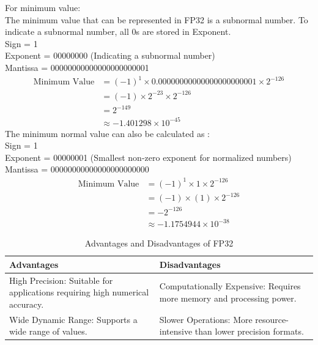 \begin{enumerate}[label=\textbf{\roman*.}]
    For minimum value:\\
    The minimum value that can be represented in FP32 is a subnormal number. To indicate a subnormal number, all 0s are stored in Exponent. \\
    Sign = 1 \\
    Exponent = 00000000 (Indicating a subnormal number)\\
    Mantissa = 00000000000000000000001
    \[
        \begin{aligned}
            \text{Minimum Value} &= (-1)^{1} \times 0.00000000000000000000001 \times 2^{-126} \\
            & = (-1) \times 2^{-23} \times 2^{-126} \\
            & =  2^{-149} \\
            & \approx -1.401298 \times 10^{-45}
        \end{aligned}
    \]
    The minimum normal value can also be calculated as : \\
    Sign = 1 \\
    Exponent = 00000001 (Smallest non-zero exponent for normalized numbers)\\
    Mantissa = 00000000000000000000000
    \[
        \begin{aligned}
            \text{Minimum Value} &= (-1)^{1} \times 1 \times 2^{-126} \\
            & = (-1) \times (1) \times 2^{-126} \\
            & =  -2^{-126} \\
            & \approx -1.1754944 \times 10^{-38}
        \end{aligned}
    \]

    \begin{table}[H]
        \centering
        \caption{Advantages and Disadvantages of FP32}
        \label{tab:fp32}
        \begin{tabular}{|p{6cm}|p{6cm}|}
        \hline
        \textbf{Advantages} & \textbf{Disadvantages} \\
        \hline
        High Precision: Suitable for applications requiring high numerical accuracy. & Computationally Expensive: Requires more memory and processing power. \\
        \hline
        Wide Dynamic Range: Supports a wide range of values. & Slower Operations: More resource-intensive than lower precision formats. \\
        \hline
        \end{tabular}
    \end{table}


\end{enumerate}
